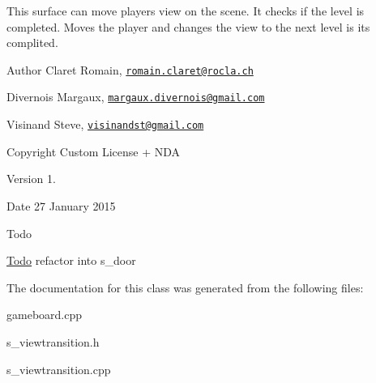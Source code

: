 This surface can move player\textquotesingle{}s view on the scene. It checks if the level is completed. Moves the player and changes the view to the next level is it\textquotesingle{}s complited. \begin{DoxyAuthor}{Author}
Claret Romain, \href{mailto:romain.claret@rocla.ch}{\tt romain.\+claret@rocla.\+ch} 

Divernois Margaux, \href{mailto:margaux.divernois@gmail.com}{\tt margaux.\+divernois@gmail.\+com} 

Visinand Steve, \href{mailto:visinandst@gmail.com}{\tt visinandst@gmail.\+com} 
\end{DoxyAuthor}
\begin{DoxyCopyright}{Copyright}
Custom License + N\+D\+A 
\end{DoxyCopyright}
\begin{DoxyVersion}{Version}
1. 
\end{DoxyVersion}
\begin{DoxyDate}{Date}
27 January 2015 
\end{DoxyDate}
\begin{DoxyRefDesc}{Todo}
\item[\hyperlink{todo__todo000031}{Todo}]refactor into s\+\_\+door \end{DoxyRefDesc}


The documentation for this class was generated from the following files\+:\begin{DoxyCompactItemize}
\item 
gameboard.\+cpp\item 
s\+\_\+viewtransition.\+h\item 
s\+\_\+viewtransition.\+cpp\end{DoxyCompactItemize}
